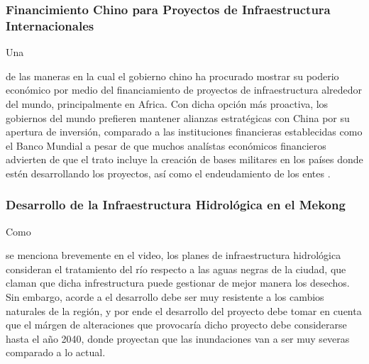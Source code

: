 \documentclass[stu, 12pt, letterpaper, donotrepeattitle, floatsintext, natbib]{apa7}
\begin{document}
\subsubsection{Financimiento Chino para Proyectos de Infraestructura Internacionales}
Una \begin{justifying}
  de las maneras en la cual el gobierno chino ha procurado mostrar su poderio económico
  por medio del financiamiento de proyectos de infraestructura alrededor del mundo, principalmente en Africa. Con dicha
  opción más proactiva, los gobiernos del mundo prefieren mantener alianzas estratégicas con China por su apertura de inversión, comparado a
  las instituciones financieras establecidas como el Banco Mundial a pesar de que muchos analístas económicos financieros advierten de que
  el trato incluye la creación de bases militares en los países donde estén desarrollando los proyectos, así como el endeudamiento de los entes \cite{simmons-2021}.\par
\end{justifying}
\vspace{\baselineskip}
\subsubsection{Desarrollo de la Infraestructura Hidrológica en el Mekong}
Como \begin{justifying}
  se menciona brevemente en el video, los planes de infraestructura hidrológica consideran el tratamiento del río respecto a las aguas negras
  de la ciudad, que claman que dicha infrestructura puede gestionar de mejor manera los desechos. Sin embargo, acorde a \cite{nhess-2021-65} %
   el desarrollo debe ser muy resistente a los cambios naturales de la región, y por ende el desarrollo del proyecto debe tomar en cuenta que
  el márgen de alteraciones que provocaría dicho proyecto debe considerarse hasta el año 2040, donde proyectan que las
  inundaciones van a ser muy severas comparado a lo actual.\par
\end{justifying}
\newpage
\setcounter{secnumdepth}{0} %
\renewcommand\refname{\textbf{Referencias}}
\end{document}
